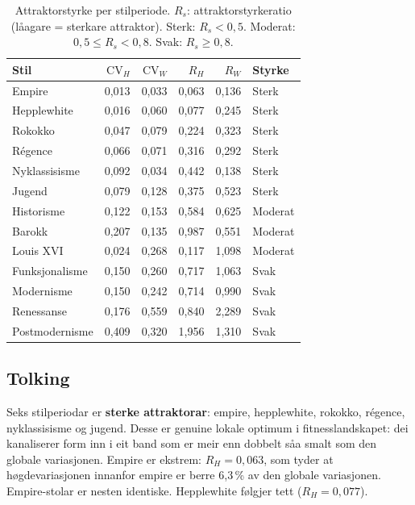 \documentclass[10pt, a4paper, twocolumn]{article}
\begin{document}
\begin{table}[H]
\centering
\caption{Attraktorstyrke per stilperiode. $R_s$: attraktorstyrkeratio (l\r{a}agare = sterkare attraktor). Sterk: $R_s < 0{,}5$. Moderat: $0{,}5 \leq R_s < 0{,}8$. Svak: $R_s \geq 0{,}8$.}
\label{tab:attraktor}
\begin{tabular}{lrrrrl}
\toprule
\textbf{Stil} & $\text{CV}_H$ & $\text{CV}_W$ & $R_H$ & $R_W$ & \textbf{Styrke} \\
\midrule
Empire         & 0,013 & 0,033 & 0,063 & 0,136 & Sterk \\
Hepplewhite    & 0,016 & 0,060 & 0,077 & 0,245 & Sterk \\
Rokokko        & 0,047 & 0,079 & 0,224 & 0,323 & Sterk \\
R\'{e}gence    & 0,066 & 0,071 & 0,316 & 0,292 & Sterk \\
Nyklassisisme  & 0,092 & 0,034 & 0,442 & 0,138 & Sterk \\
Jugend         & 0,079 & 0,128 & 0,375 & 0,523 & Sterk \\
Historisme     & 0,122 & 0,153 & 0,584 & 0,625 & Moderat \\
Barokk         & 0,207 & 0,135 & 0,987 & 0,551 & Moderat \\
Louis XVI      & 0,024 & 0,268 & 0,117 & 1,098 & Moderat \\
Funksjonalisme & 0,150 & 0,260 & 0,717 & 1,063 & Svak \\
Modernisme     & 0,150 & 0,242 & 0,714 & 0,990 & Svak \\
Renessanse     & 0,176 & 0,559 & 0,840 & 2,289 & Svak \\
Postmodernisme & 0,409 & 0,320 & 1,956 & 1,310 & Svak \\
\bottomrule
\end{tabular}
\end{table}


\subsection{Tolking}

Seks stilperiodar er \textbf{sterke attraktorar}: empire, hepplewhite, rokokko, r\'{e}gence, nyklassisisme og jugend. Desse er genuine lokale optimum i fitnesslandskapet: dei kanaliserer form inn i eit band som er meir enn dobbelt s\r{a}a smalt som den globale variasjonen. Empire er ekstrem: $R_H = 0{,}063$, som tyder at h\o gdevariasjonen innanfor empire er berre 6{,}3\,\% av den globale variasjonen. Empire-stolar er nesten identiske. Hepplewhite f\o lgjer tett ($R_H = 0{,}077$).
\end{document}

